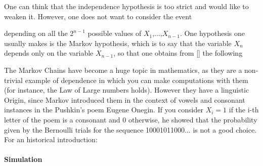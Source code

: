 One can think that the independence hypothesis is too strict and would like to weaken it. However, one does not want to consider the event 
	
depending on all the $2^{n-1}$ possible values of $X_1$,...,$X_{n-1}$. One hypothesis one usually makes is the Markov hypothesis, which is to say that the variable $X_n$ depends only on the variable $X_{n-1}$, so that one obtains from \eqref{} the following

The Markov Chains have become a huge topic in mathematics, as they are a non-trivial example of dependence in which you can make computations with them (for instance, the Law of Large numbers holds). However they have a linguistic Origin, since Markov introduced them in the context of vowels and consonant instances in the Pushkin's poem Eugene Onegin. If you consider $X_i = 1$ if the i-th letter of the poem is a consonant and 0 otherwise, he showed that the probability given by the Bernoulli trials for the sequence 10001011000... is not a good choice. For an historical introduction: 
	
	\paragraph{Simulation }
	
